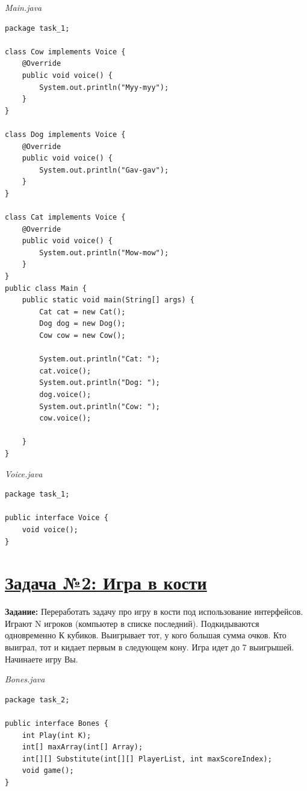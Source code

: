 \documentclass[a4paper]{article}
\begin{document}
\begin{minipage}{0.5\textwidth}
    \textit{Main.java}
    \begin{lstlisting}
package task_1;

class Cow implements Voice {
    @Override
    public void voice() {
        System.out.println("Myy-myy");
    }
}

class Dog implements Voice {
    @Override
    public void voice() {
        System.out.println("Gav-gav");
    }
}

class Cat implements Voice {
    @Override
    public void voice() {
        System.out.println("Mow-mow");
    }
}
public class Main {
    public static void main(String[] args) {
        Cat cat = new Cat();
        Dog dog = new Dog();
        Cow cow = new Cow();

        System.out.println("Cat: ");
        cat.voice();
        System.out.println("Dog: ");
        dog.voice();
        System.out.println("Cow: ");
        cow.voice();

    }
}   
        \end{lstlisting}
\end{minipage}
\hfill
\begin{minipage}{0.5\textwidth}
        \textit{Voice.java}
        \begin{lstlisting}
package task_1;

public interface Voice {
    void voice();
}
        \end{lstlisting}
\end{minipage}



\newpage

\section{\href{https://github.com/yarvod/NetCracker_LearningCenter/tree/main/Practise_tasks/Practice_task_2/task_2}{Задача №2: Игра в кости}}

\textbf{Задание:} Переработать задачу про игру в кости под использование интерфейсов.
Играют N игроков (компьютер в списке последний). Подкидываются одновременно К кубиков. Выигрывает тот, у кого большая сумма очков. Кто выиграл, тот и кидает первым в следующем кону. Игра идет до 7 выигрышей. Начинаете игру Вы. \par 

\textit{Bones.java}
\begin{lstlisting}
package task_2;

public interface Bones {
    int Play(int K);
    int[] maxArray(int[] Array);
    int[][] Substitute(int[][] PlayerList, int maxScoreIndex);
    void game();
}
\end{lstlisting}
\end{document}
